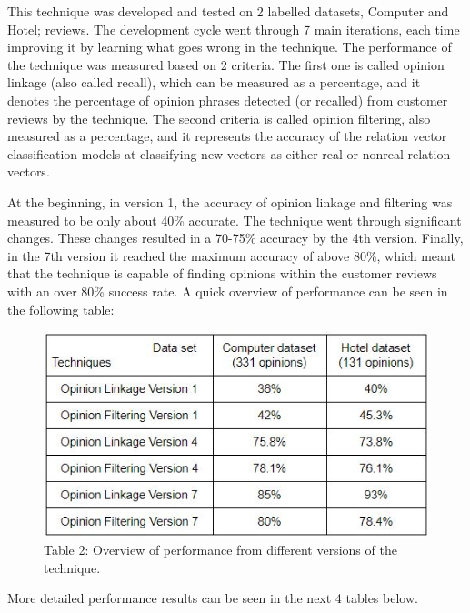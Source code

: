 \documentclass{sig-alternate}
\begin{document}
This technique was developed and tested on 2 labelled datasets, Computer\cite{HuLiu2004} and Hotel\cite{WangLuZhai2010};\cite{WangLuZhai2011} reviews. The development cycle went through 7 main iterations, each time improving it by learning what goes wrong in the technique. The performance of the technique was measured based on 2 criteria. The first one is called opinion linkage (also called recall), which can be measured as a percentage, and it denotes the percentage of opinion phrases detected (or recalled) from customer reviews by the technique. The second criteria is called opinion filtering, also measured as a percentage, and it represents the accuracy of the relation vector classification models at classifying new vectors as either real or nonreal relation vectors.

At the beginning, in version 1, the accuracy of opinion linkage and filtering was measured to be only about 40\% accurate. The technique went through significant changes. These changes resulted in a 70-75\% accuracy by the 4th version. Finally, in the 7th version it reached the maximum accuracy of above 80\%, which meant that the technique is capable of finding opinions within the customer reviews with an over 80\% success rate. A quick overview of performance can be seen in the following table:

\begin{figure}
\centering
\includegraphics[scale=0.75]{images/table2.JPG}
Table 2: Overview of performance from different versions of the technique.
\end{figure}

More detailed performance results can be seen in the next 4 tables below.
\end{document}

